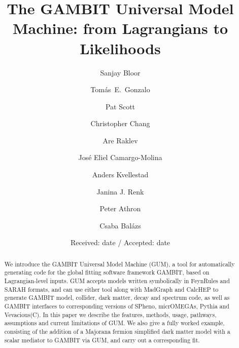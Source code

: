 \documentclass[pdftex,twocolumn,epjc3_preprint,runningheads]{svjour3}
\makeatletter
\newcommand{\gambitinstitute}[1]{\expandafter\csname #1\endcsname\label{#1}}
\newcommand{\gi}[1]{\gambitinstitute{#1}\and}
\newcommand{\last}[1]{\gambitinstitute{#1}}
\newcommand{\preprintnumber}[1]{\gdef\@preprintnumber{\begin{flushright}{#1}\end{flushright}}}
\renewcommand{\_}{\discretionary{\underscore}{}{\underscore}}
\newcommand{\gambit}{\textsf{GAMBIT}\xspace}
\newcommand{\GB}{\gambit}
\newcommand{\pythia}{\textsf{Pythia}\xspace}
\newcommand{\mo}{\micromegas}
\newcommand{\micromegas}{\textsf{micrOMEGAs}\xspace}
\newcommand{\gum}{\textsf{GUM}\xspace}
\newcommand{\fr}{\textsf{FeynRules}\xspace}
\newcommand{\sarah}{\textsf{SARAH}\xspace}
\newcommand{\CH}{\textsf{CalcHEP}\xspace}
\newcommand{\MG}{\textsf{MadGraph}\xspace}
\newcommand{\veva}{\textsf{Vevacious}\xspace}
\newcommand{\spheno}{\textsf{SPheno}\xspace}
\newcommand\xx{\raisebox{0.2ex}{\smaller ++}\xspace}
\makeatother
\begin{document}
\preprintnumber{TTK-21-24, gambit-code-21}


\title{The GAMBIT Universal Model Machine: from Lagrangians to Likelihoods}


\author{Sanjay Bloor \and
Tom\'as~E.~Gonzalo \and
Pat Scott \and
Christopher Chang \and
Are Raklev \and
Jos{\'e} Eliel Camargo-Molina \and
Anders Kvellestad \and
Janina J. Renk \and
Peter Athron \and
Csaba Bal{\'a}zs
}

\institute{
  \gi{imperial}
  \gi{uq}
  \gi{aachen}
  \gi{monash}
  \gi{oslo}
  \gi{uppsala}
  \gi{okc}
  \last{nanjing}
}



\date{Received: date / Accepted: date}

\maketitle

\begin{abstract}
We introduce the \GB Universal Model Machine (\gum), a tool for automatically generating code for the global fitting software framework \GB, based on Lagrangian-level inputs.  \gum accepts models written symbolically in \fr and \sarah formats, and can use either tool along with \MG and \CH to generate \GB model, collider, dark matter, decay and spectrum code, as well as \GB interfaces to corresponding versions of \spheno, \mo, \pythia and \veva (C\xx).  In this paper we describe the features, methods, usage, pathways, assumptions and current limitations of \gum.  We also give a fully worked example, consisting of the addition of a Majorana fermion simplified dark matter model with a scalar mediator to \GB via \gum, and carry out a corresponding fit.

\end{abstract}
\end{document}
